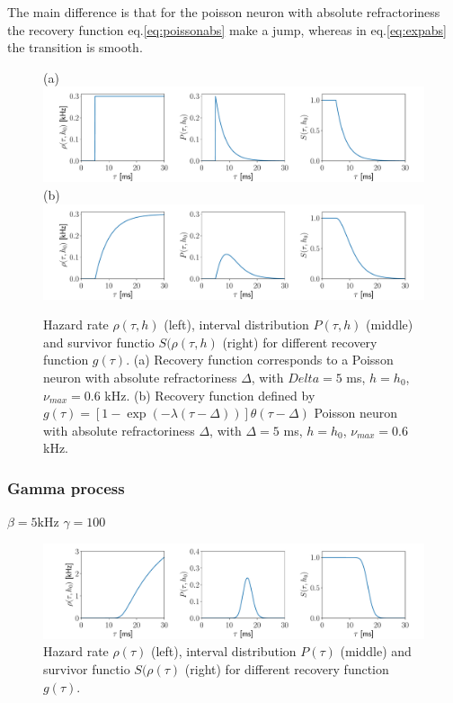 \documentclass{report}
\begin{document}
The main difference is that for the poisson neuron with absolute refractoriness the recovery function eq.\eqref{eq:poissonabs} make a jump, whereas in eq.\eqref{eq:expabs} the transition is smooth.
\begin{figure}
(a) \\
	\includegraphics[width=\linewidth]{poissonRHOSP.pdf}
	(b)\\
	\includegraphics[width=\linewidth]{expRHOSP.pdf}
	\caption{Hazard rate $\rho(\tau,h)$ (left), interval distribution $P(\tau,h)$ (middle) and survivor functio $S(\rho(\tau,h)$ (right) for different recovery function $g(\tau)$. (a) Recovery function corresponds to a Poisson neuron with absolute refractoriness $\Delta$, with $Delta=5$ ms, $h=h_0$, $\nu_{max}=0.6$ kHz.  (b) Recovery function defined  by $ g(\tau)=\left[1-\exp(-\lambda(\tau-\Delta))\right]\theta(\tau-\Delta)$ Poisson neuron with absolute refractoriness $\Delta$, with $\Delta=5$ ms, $h=h_0$, $\nu_{max}=0.6$ kHz.  }
	\label{fig:renewalprocess}
\end{figure}
 

\subsubsection{Gamma process}

$\beta=5$kHz
$\gamma=100$


\begin{figure}

	\includegraphics[width=\linewidth]{gamma.pdf}
	\caption{Hazard rate $\rho(\tau)$ (left), interval distribution $P(\tau)$ (middle) and survivor functio $S(\rho(\tau)$ (right) for different recovery function $g(\tau)$. }
	\label{fig:renewalprocess}
\end{figure}
\end{document}
